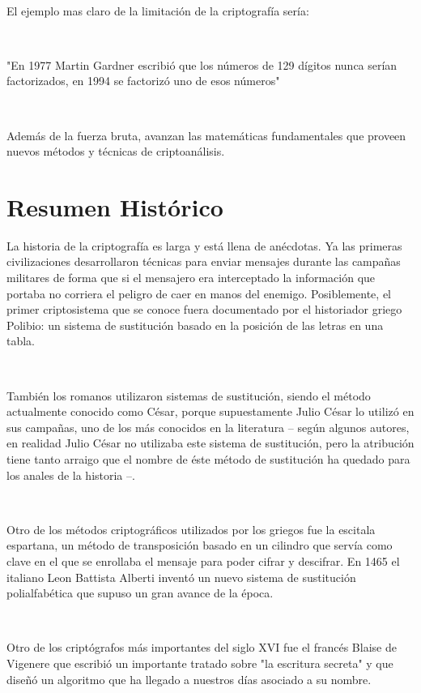 \documentclass[11pt, conference]{IEEEtran}
\begin{document}
\

El ejemplo mas claro de la limitación de la criptografía sería:

\

"En 1977 Martin Gardner escribió que los números de 129 dígitos nunca serían factorizados, en 1994 se factorizó uno de esos números"

\

Además de la fuerza bruta, avanzan las matemáticas fundamentales que proveen nuevos métodos y técnicas de criptoanálisis.

\section{Resumen Histórico}
La historia de la criptografía es larga y está llena de anécdotas. Ya las primeras civilizaciones desarrollaron técnicas para enviar mensajes durante las campañas militares de forma que si el mensajero era interceptado la información que portaba no corriera el peligro de caer en manos del enemigo. Posiblemente, el primer criptosistema que se conoce fuera documentado por el historiador griego Polibio: un sistema de sustitución basado en la posición de las letras en una tabla. 

\

También los romanos utilizaron sistemas de sustitución, siendo el método actualmente conocido como César, porque supuestamente Julio César lo utilizó en sus campañas, uno de los más conocidos en la literatura – según algunos autores, en realidad Julio César no utilizaba este sistema de sustitución, pero la atribución tiene tanto arraigo que el nombre de éste método de sustitución ha quedado para los anales de la historia –. 

\

Otro de los métodos criptográficos utilizados por los griegos fue la escitala espartana, un método de transposición basado en un cilindro que servía como clave en el que se enrollaba el mensaje para poder cifrar y descifrar. En 1465 el italiano Leon Battista Alberti inventó un nuevo sistema de sustitución polialfabética que supuso un gran avance de la época. 

\

Otro de los criptógrafos más importantes del siglo XVI fue el francés Blaise de Vigenere que escribió un importante tratado sobre "la escritura secreta" y que diseñó un algoritmo que ha llegado a nuestros días asociado a su nombre. 

\
\end{document}
